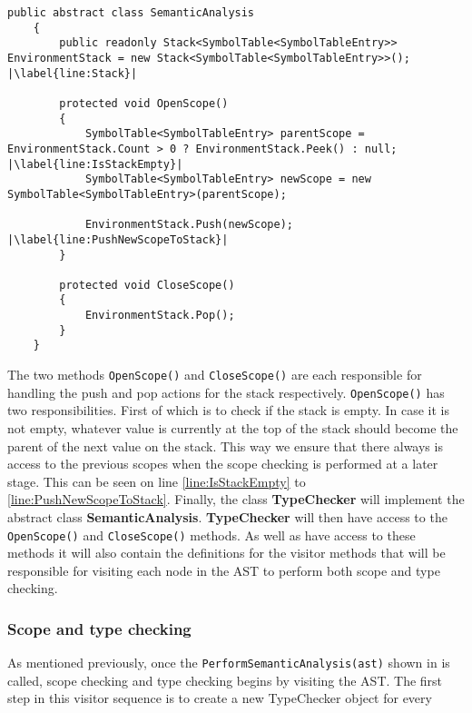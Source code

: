 \begin{lstlisting}[caption={Abstract class SemanticAnalysis}, label={lst:ACSemanticAnalysis},escapechar=|]
    public abstract class SemanticAnalysis
    {
        public readonly Stack<SymbolTable<SymbolTableEntry>> EnvironmentStack = new Stack<SymbolTable<SymbolTableEntry>>(); |\label{line:Stack}|

        protected void OpenScope()
        {
            SymbolTable<SymbolTableEntry> parentScope = EnvironmentStack.Count > 0 ? EnvironmentStack.Peek() : null; |\label{line:IsStackEmpty}|
            SymbolTable<SymbolTableEntry> newScope = new SymbolTable<SymbolTableEntry>(parentScope);
            
            EnvironmentStack.Push(newScope); |\label{line:PushNewScopeToStack}|
        }

        protected void CloseScope()
        {
            EnvironmentStack.Pop();
        }
    }
\end{lstlisting}

The two methods \texttt{OpenScope()} and \texttt{CloseScope()} are each responsible for handling the push and pop actions for the stack respectively.
\texttt{OpenScope()} has two responsibilities. First of which is to check if the stack is empty. In case it is not empty, whatever value is currently at the top of the stack should become the parent of the next value on the stack. This way we ensure that there always is access to the previous scopes when the scope checking is performed at a later stage. This can be seen on line \ref{line:IsStackEmpty} to \ref{line:PushNewScopeToStack}.
Finally, the class \textbf{TypeChecker} will implement the abstract class \textbf{SemanticAnalysis}. \textbf{TypeChecker} will then have access to the \texttt{OpenScope()} and \texttt{CloseScope()} methods. As well as have access to these methods it will also contain the definitions for the visitor methods that will be responsible for visiting each node in the AST to perform both scope and type checking.

\subsubsection*{Scope and type checking}
As mentioned previously, once the \texttt{PerformSemanticAnalysis(ast)} shown in  is called, scope checking and type checking begins by visiting the AST. The first step in this visitor sequence is to create a new TypeChecker object for every 